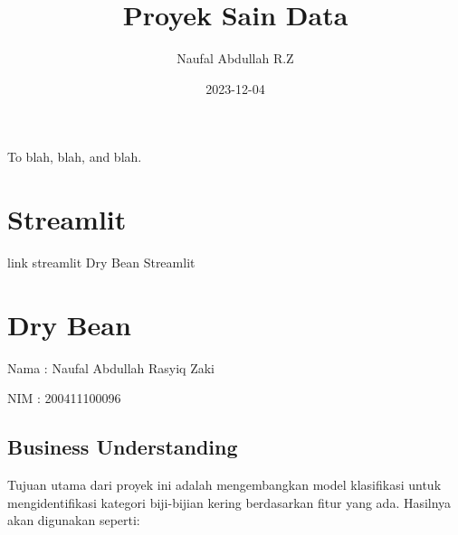 \documentclass[
  letterpaper,
]{krantz}
\title{Proyek Sain Data}
\author{Naufal Abdullah R.Z}
\date{2023-12-04}
\renewcommand*\contentsname{Table of contents}
\newcommand\contentsname{Table of contents}
\begin{document}
\maketitle

\thispagestyle{empty}

\begin{center}
To blah, blah, and blah.
\end{center}

\setlength{\abovedisplayskip}{-5pt}
\setlength{\abovedisplayshortskip}{-5pt}

\ifdefined\Shaded\renewenvironment{Shaded}{\begin{tcolorbox}[interior hidden, borderline west={3pt}{0pt}{shadecolor}, sharp corners, frame hidden, breakable, boxrule=0pt, enhanced]}{\end{tcolorbox}}\fi

\renewcommand*\contentsname{Table of contents}
{
\hypersetup{linkcolor=}
\setcounter{tocdepth}{2}
\tableofcontents
}

\hypertarget{streamlit}{%
\chapter*{Streamlit}\label{streamlit}}


link streamlit Dry Bean Streamlit

\mainmatter


\hypertarget{dry-bean}{%
\chapter{Dry Bean}\label{dry-bean}}

Nama : Naufal Abdullah Rasyiq Zaki

NIM : 200411100096

\hypertarget{business-understanding}{%
\section{Business Understanding}\label{business-understanding}}

Tujuan utama dari proyek ini adalah mengembangkan model klasifikasi
untuk mengidentifikasi kategori biji-bijian kering berdasarkan fitur
yang ada. Hasilnya akan digunakan seperti:
\end{document}
